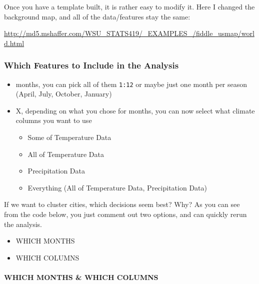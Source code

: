 \documentclass[
]{article}
\providecommand{\tightlist}{%
  \setlength{\itemsep}{0pt}\setlength{\parskip}{0pt}}
\begin{document}
Once you have a template built, it is rather easy to modify it. Here I
changed the background map, and all of the data/features stay the same:

\url{http://md5.mshaffer.com/WSU_STATS419/_EXAMPLES_/fiddle_usmap/world.html}

\hypertarget{which-features-to-include-in-the-analysis}{%
\subsubsection{Which Features to Include in the
Analysis}\label{which-features-to-include-in-the-analysis}}

\begin{itemize}
\tightlist
\item
  months, you can pick all of them \texttt{1:12} or maybe just one month
  per season (April, July, October, January)
\item
  X, depending on what you chose for months, you can now select what
  climate columns you want to use

  \begin{itemize}
  \tightlist
  \item
    Some of Temperature Data
  \item
    All of Temperature Data
  \item
    Precipitation Data
  \item
    Everything (All of Temperature Data, Precipitation Data)
  \end{itemize}
\end{itemize}

If we want to cluster cities, which decisions seem best? Why? As you can
see from the code below, you just comment out two options, and can
quickly rerun the analysis.

\begin{itemize}
\tightlist
\item
  WHICH MONTHS
\item
  WHICH COLUMNS
\end{itemize}

\hypertarget{which-months-which-columns}{%
\paragraph{WHICH MONTHS \& WHICH
COLUMNS}\label{which-months-which-columns}}
\end{document}

